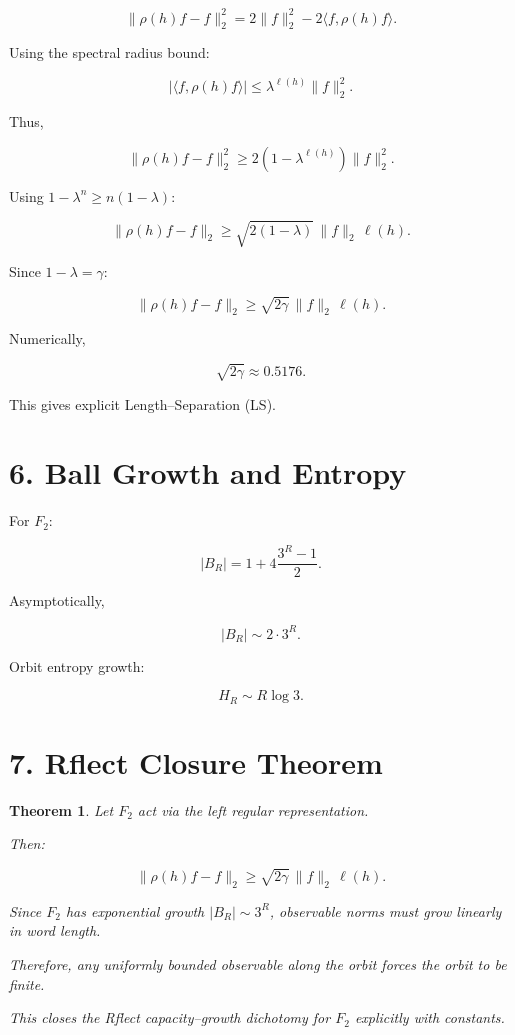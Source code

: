 \documentclass[11pt]{article}
\newtheorem{theorem}{Theorem}
\begin{document}
\[
\|\rho(h)f - f\|_2^2
= 2\|f\|_2^2 - 2\langle f,\rho(h)f\rangle.
\]

Using the spectral radius bound:

\[
|\langle f,\rho(h)f\rangle|
\le \lambda^{\ell(h)}\|f\|_2^2.
\]

Thus,

\[
\|\rho(h)f - f\|_2^2
\ge 2(1 - \lambda^{\ell(h)})\|f\|_2^2.
\]

Using $1 - \lambda^n \ge n(1-\lambda)$:

\[
\|\rho(h)f - f\|_2
\ge \sqrt{2(1-\lambda)}\,\|f\|_2\,\ell(h).
\]

Since $1-\lambda=\gamma$:

\[
\|\rho(h)f - f\|_2
\ge \sqrt{2\gamma}\,\|f\|_2\,\ell(h).
\]

Numerically,

\[
\sqrt{2\gamma} \approx 0.5176.
\]

This gives explicit Length--Separation (LS).

\section*{6. Ball Growth and Entropy}

For $F_2$:

\[
|B_R| = 1 + 4\frac{3^R - 1}{2}.
\]

Asymptotically,

\[
|B_R| \sim 2 \cdot 3^R.
\]

Orbit entropy growth:

\[
H_R \sim R\log 3.
\]

\section*{7. Rflect Closure Theorem}

\begin{theorem}
Let $F_2$ act via the left regular representation.

Then:

\[
\|\rho(h)f - f\|_2
\ge \sqrt{2\gamma}\,\|f\|_2\,\ell(h).
\]

Since $F_2$ has exponential growth $|B_R|\sim 3^R$,
observable norms must grow linearly in word length.

Therefore, any uniformly bounded observable along the orbit
forces the orbit to be finite.

This closes the Rflect capacity--growth dichotomy
for $F_2$ explicitly with constants.
\end{theorem}
\end{document}
